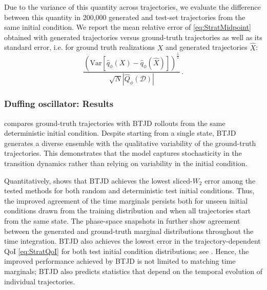 \documentclass[oneside,11pt]{article}
\theoremstyle{remark}
\begin{document}
Due to the variance of this quantity across trajectories, we evaluate the difference between this quantity in 200,000 generated and test-set trajectories from the same initial condition. We report the mean relative error of \eqref{eq:StratMidpoint} obtained with generated trajectories versus ground-truth trajectories as well as its standard error, i.e. for ground truth realizations $X$ and generated trajectories  $\hat{X}$:
\begin{equation}\label{eq:StratRelErrSE}
    \frac{\left(\textrm{Var}\left[ \hat{q}_{\phi}(X)- \hat{q}_{\phi}(\hat{X}) \right]\right)^{\frac{1}{2}}}{\sqrt{N} \left| \hat{Q}_{\phi}(\mathcal{D}) \right|}\,.
\end{equation}


\subsubsection{Duffing oscillator: Results}\label{sec:NumExp:Duffing:Results}  compares ground-truth trajectories with BTJD rollouts from the same deterministic initial condition. Despite starting from a single state, BTJD generates a diverse ensemble with the qualitative variability of the ground-truth trajectories. This demonstrates that the model captures stochasticity in the transition dynamics rather than relying on variability in the initial condition.

Quantitatively,  shows that BTJD achieves the lowest sliced-$W_2$ error among the tested methods for both random and deterministic test initial conditions. Thus, the improved agreement of the time marginals persists both for unseen initial conditions drawn from the training distribution and when all trajectories start from the same state. The phase-space snapshots in  further show agreement between the generated and ground-truth marginal distributions throughout the time integration. BTJD also achieves the lowest error in the trajectory-dependent QoI \eqref{eq:StratQoI} for both test initial condition distributions; see . Hence, the improved performance achieved by BTJD is not limited to matching time marginals; BTJD also predicts statistics that depend on the temporal evolution of individual trajectories.
\end{document}
